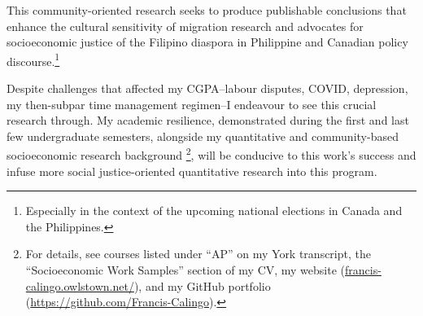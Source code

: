 \documentclass{article}
\begin{document}
\vspace{10pt}

This community-oriented research seeks to produce publishable conclusions that enhance the cultural sensitivity of migration research and advocates for socioeconomic justice of the Filipino diaspora in Philippine and Canadian policy discourse.\footnote{Especially in the context of the upcoming national elections in Canada and the Philippines.}

\vspace{10pt}

Despite challenges that affected my CGPA–labour disputes, COVID, depression, my then-subpar time management regimen–I endeavour to see this crucial research through. My academic resilience, demonstrated during the first and last few undergraduate semesters, alongside my quantitative and community-based socioeconomic research background \footnote{For details, see courses listed under “AP” on my York transcript, the “Socioeconomic Work Samples” section of my CV, my website (\url{francis-calingo.owlstown.net/}), and my GitHub portfolio (\url{https://github.com/Francis-Calingo}).}, will be conducive to this work’s success and infuse more social justice-oriented quantitative research into this program.
\end{document}

